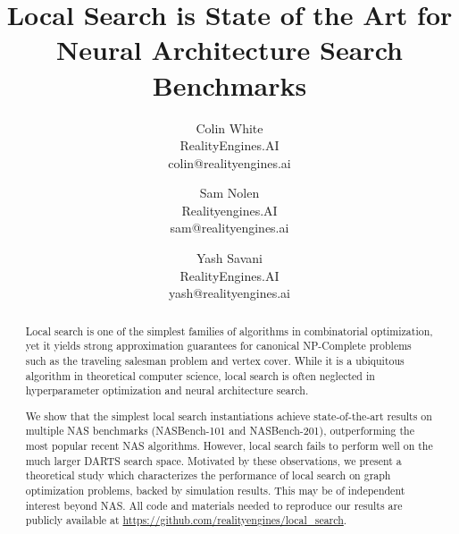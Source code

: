 \documentclass[11pt]{article}
\title{Local Search is State of the Art for Neural Architecture Search Benchmarks}
\author{
Colin White
\\
RealityEngines.AI\\
colin@realityengines.ai
\and 
Sam Nolen
\\
Realityengines.AI\\
sam@realityengines.ai
\\
\and
Yash Savani
\\
RealityEngines.AI\\
yash@realityengines.ai
}
\date{}
\numberwithin{equation}{section}
\numberwithin{figure}{section}
\theoremstyle{plain}
\theoremstyle{definition}
\begin{document}
\maketitle


\begin{abstract}Local search is one of the simplest families of algorithms in 
combinatorial optimization, yet it yields
strong approximation guarantees for canonical NP-Complete 
problems such as the traveling salesman problem
and vertex cover.
While it is a ubiquitous algorithm in theoretical computer science, 
local search is often neglected in hyperparameter optimization
and neural architecture search.

We show that the simplest local search instantiations achieve 
state-of-the-art results on 
multiple NAS benchmarks (NASBench-101 and NASBench-201),
outperforming the most popular recent NAS algorithms.
However, local search fails to perform well on the much larger DARTS search space.
Motivated by these observations, we present a theoretical study which
characterizes the performance of local search on graph optimization problems,
backed by simulation results. This may be of independent interest beyond NAS.
All code and materials needed to reproduce our results are
publicly available at \url{https://github.com/realityengines/local_search}.
\end{abstract}

\begin{comment}
Local search is one of the simplest families of algorithms in combinatorial optimization, yet it yields strong approximation guarantees for canonical NP-Complete problems such as the traveling salesman problem and vertex cover. While it is a ubiquitous algorithm in theoretical computer science, local search has been widely neglected in hyperparameter optimization, and has never been used to perform neural architecture search (NAS).

We show that the simplest local search instantiations achieve state-of-the-art results on multiple NAS benchmarks (NASBench-101 and NASBench-201), outperforming the most popular recent NAS algorithms. However, local search fails to perform well on the much larger DARTS search space. Motivated by these observations, we present a theoretical study which characterizes the performance of local search on graph optimization problems, backed by simulation results. This may be of independent interest beyond NAS. All code and materials needed to reproduce our results are
publicly available at https://github.com/realityengines/local_search.
\end{comment}
 
\end{document}

